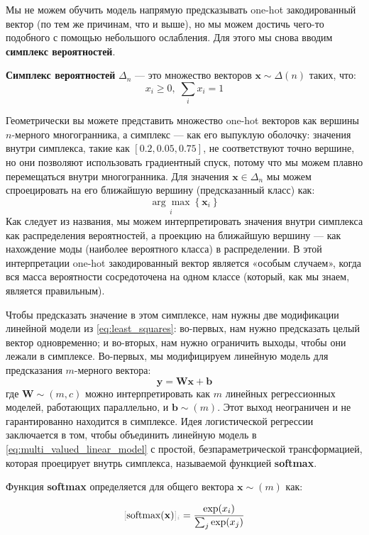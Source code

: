 Мы не можем обучить модель напрямую предсказывать one-hot закодированный вектор (по тем же причинам, что и выше), но мы можем достичь чего-то подобного с помощью небольшого ослабления. Для этого мы снова вводим \textbf{симплекс вероятностей}.

\begin{definition}
\textbf{Симплекс вероятностей} $\Delta_n$ — это множество векторов $\mathbf{x} \sim \Delta(n)$ таких, что:
%
$$
x_i \ge 0, \; \sum_i x_i=1
$$
%
\end{definition}

Геометрически вы можете представить множество one-hot векторов как вершины $n$-мерного многогранника, а симплекс — как его выпуклую оболочку: значения внутри симплекса, такие как $[0.2, 0.05, 0.75]$, не соответствуют точно вершине, но они позволяют использовать градиентный спуск, потому что мы можем плавно перемещаться внутри многогранника. Для значения $\mathbf{x} \in \Delta_n$ мы можем спроецировать на его ближайшую вершину (предсказанный класс) как:
%
$$
\underset{i}{\arg\max} \left\{ \mathbf{x}_i \right\}
$$
%
Как следует из названия, мы можем интерпретировать значения внутри симплекса как распределения вероятностей, а проекцию на ближайшую вершину — как нахождение моды (наиболее вероятного класса) в распределении. В этой интерпретации one-hot закодированный вектор является «особым случаем», когда вся масса вероятности сосредоточена на одном классе (который, как мы знаем, является правильным).

Чтобы предсказать значение в этом симплексе, нам нужны две модификации линейной модели из \eqref{eq:least_squares}: во-первых, нам нужно предсказать целый вектор одновременно; и во-вторых, нам нужно ограничить выходы, чтобы они лежали в симплексе. Во-первых, мы модифицируем линейную модель для предсказания $m$-мерного вектора:
%
\begin{equation}
\mathbf{y} =\mathbf{W}\mathbf{x}+\mathbf{b}
\label{eq:multi_valued_linear_model}
\end{equation}
%
где $\mathbf{W} \sim (m,c)$ можно интерпретировать как $m$ линейных регрессионных моделей, работающих параллельно, и $\mathbf{b} \sim(m)$. Этот выход неограничен и не гарантированно находится в симплексе. Идея логистической регрессии заключается в том, чтобы объединить линейную модель в \eqref{eq:multi_valued_linear_model} с простой, безпараметрической трансформацией, которая проецирует внутрь симплекса, называемой функцией \textbf{softmax}.

\begin{definition} \addbottle
Функция \textbf{softmax} определяется для общего вектора $\mathbf{x} \sim(m)$ как:

\begin{equation}
\idx{\textnormal{softmax}(\mathbf{x})}{i} = \frac{\exp(x_i)}{\sum_j\exp(x_j)}
\label{eq:softmax}
\end{equation}

\end{definition}

